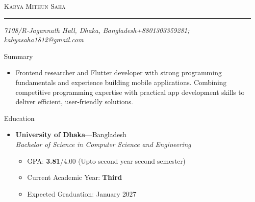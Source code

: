 \documentclass[10pt,oneside]{article}
\makeatletter
\newcommand{\name}{Kabya Mithun Saha}
\newcommand{\addr}{7108/R-Jagannath Hall, Dhaka, Bangladesh}
\newcommand{\phone}{+8801303359281}
\newcommand{\email}{\href{mailto:kabyasaha1812@gmail.com}{kabyasaha1812@gmail.com}}
\newcommand{\bigname}[1]{
  \begin{center}\fontfamily{phv}\selectfont\Huge\scshape#1\end{center}
}
\newenvironment{ressection}[1]{
  \vspace{4pt}
  {\fontfamily{phv}\selectfont\Large#1}
  \begin{itemize}
  \vspace{3pt}
}{
  \end{itemize}
}
\newcommand{\resitem}[1]{
  \vspace{-4pt}
  \item \begin{flushleft} #1 \end{flushleft}
}
\newcommand{\ressubitem}[1]{
  \vspace{-1pt}
  \item \begin{flushleft} #1 \end{flushleft}
}
\newcommand{\resbigitem}[3]{
  \vspace{-5pt}
  \item
  \textbf{#1}---#2 \\
  \textit{#3}
}
\newenvironment{ressubsec}[3]{
  \resbigitem{#1}{#2}{#3}
  \vspace{-2pt}
  \begin{itemize}
}{
  \end{itemize}
}
\makeatother
\begin{document}
 \selectfont

\bigname{\name}

\vspace{-8pt} \rule{\textwidth}{1pt}

\vspace{-1pt} {\small\itshape \addr \hfill \phone; \email}

\vspace{8 pt}

\begin{ressection}{Summary}
    \resitem{Frontend researcher and Flutter developer with strong programming fundamentals and experience building mobile applications. Combining competitive programming expertise with practical app development skills to deliver efficient, user-friendly solutions.}
\end{ressection}

\begin{ressection}{Education}

  \begin{ressubsec}{University of Dhaka}{Bangladesh}{Bachelor of Science in Computer Science and Engineering}
    \ressubitem{GPA: \textbf{3.81}/4.00 (Upto second year second semester)}
    \ressubitem{Current Academic Year: \textbf{Third}}
    \ressubitem{Expected Graduation: January 2027}
  \end{ressubsec}

\end{ressection}
\end{document}
